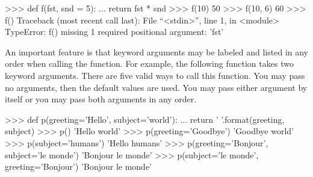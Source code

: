 \documentclass[11pt]{cselabheader}
\begin{document}
\begin{pyconcode}
>>> def f(fst, snd = 5):
...    return fst * snd
>>> f(10)
50
>>> f(10, 6)
60
>>> f()
Traceback (most recent call last):
  File ``<stdin>'', line 1, in <module>
TypeError: f() missing 1 required positional argument: 'fst'

\end{pyconcode}

An important feature is that keyword arguments may be labeled
and listed in any order when calling the function. For example,
the following function takes two keyword arguments. There are five
valid ways to call this function. You may pass no arguments, then
the default values are used. You may pass either argument by itself
or you may pass both arguments in any order.

\begin{pyconcode}
>>> def p(greeting='Hello', subject='world'):
...     return '{} {}'.format(greeting, subject)
>>> p()
'Hello world'
>>> p(greeting='Goodbye')
'Goodbye world'
>>> p(subject='humans')
'Hello humans'
>>> p(greeting='Bonjour', subject='le monde')
'Bonjour le monde'
>>> p(subject='le monde', greeting='Bonjour')
'Bonjour le monde'

\end{pyconcode}




\newpage
\end{document}
